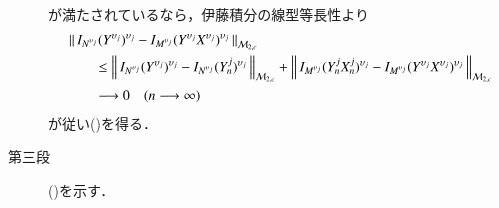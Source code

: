 \begin{prf}
\begin{description}
\begin{align}
				\end{align}
				が満たされているなら，伊藤積分の線型等長性より
				\begin{align}
					&\left\|\, I_{N^{\upsilon_j}} (Y^{\upsilon_j})^{\upsilon_j} - I_{M^{\upsilon_j}} (Y^{\upsilon_j}X^{\upsilon_j})^{\upsilon_j}\, \right\|_{\mathcal{M}_{2,c}} \\
					&\qquad \leq \left\|\, I_{N^{\upsilon_j}} (Y^{\upsilon_j})^{\upsilon_j} - I_{N^{\upsilon_j}} (Y^j_n)^{\upsilon_j}\, \right\|_{\mathcal{M}_{2,c}}
						+ \left\|\, I_{M^{\upsilon_j}} (Y_n^j X_n^j)^{\upsilon_j} - I_{M^{\upsilon_j}} (Y^{\upsilon_j}X^{\upsilon_j})^{\upsilon_j}\, \right\|_{\mathcal{M}_{2,c}} \\
					&\qquad \longrightarrow 0 \quad (n \longrightarrow \infty)
				\end{align}
				が従い()を得る．
			
			\item[第三段]
				()を示す．
				\QED
		\end{description}
	\end{prf}